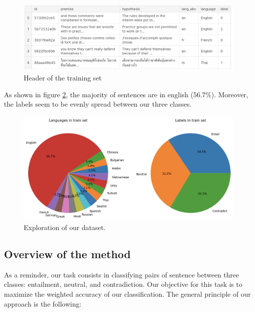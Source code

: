 \documentclass[final]{cvpr}
\begin{document}
\begin{figure}[ht]
	\centering
	\includegraphics[width=\columnwidth]{figures/header.png}
	\caption{Header of the training set}
    \label{header}
\end{figure}

As shown in figure \ref{exploration}, the majority of sentences are in english (56.7\%). Moreover, the labels seem to be evenly spread between our three classes.

\begin{figure}[ht]
	\centering
	\includegraphics[width=\columnwidth]{figures/exploration.png}
	\caption{Exploration of our dataset.}
    \label{exploration}
\end{figure}

\subsection{Overview of the method}

As a reminder, our task consists in classifying pairs of sentence between three classes: entailment, neutral, and contradiction. Our objective for this task is to maximize the weighted accuracy of our classification. The general principle of our approach is the following:
\end{document}
